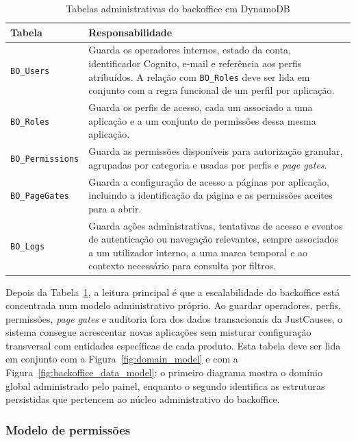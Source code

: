 \begin{table}[H]
\caption{Tabelas administrativas do backoffice em DynamoDB}
\label{tab:modelo_dados_admin}
\begin{center}
\small
\begin{tabular}{|l|p{9cm}|}
\hline
\textbf{Tabela} & \textbf{Responsabilidade} \\ \hline
\texttt{BO\_Users} & Guarda os operadores internos, estado da conta, identificador Cognito, e-mail e referência aos perfis atribuídos. A relação com \texttt{BO\_Roles} deve ser lida em conjunto com a regra funcional de um perfil por aplicação. \\ \hline
\texttt{BO\_Roles} & Guarda os perfis de acesso, cada um associado a uma aplicação e a um conjunto de permissões dessa mesma aplicação. \\ \hline
\texttt{BO\_Permissions} & Guarda as permissões disponíveis para autorização granular, agrupadas por categoria e usadas por perfis e \textit{page gates}. \\ \hline
\texttt{BO\_PageGates} & Guarda a configuração de acesso a páginas por aplicação, incluindo a identificação da página e as permissões aceites para a abrir. \\ \hline
\texttt{BO\_Logs} & Guarda ações administrativas, tentativas de acesso e eventos de autenticação ou navegação relevantes, sempre associados a um utilizador interno, a uma marca temporal e ao contexto necessário para consulta por filtros. \\ \hline
\end{tabular}
\end{center}
\end{table}

Depois da Tabela~\ref{tab:modelo_dados_admin}, a leitura principal é que a escalabilidade do backoffice está concentrada num modelo administrativo próprio. Ao guardar operadores, perfis, permissões, \textit{page gates} e auditoria fora dos dados transacionais da JustCauses, o sistema consegue acrescentar novas aplicações sem misturar configuração transversal com entidades específicas de cada produto. Esta tabela deve ser lida em conjunto com a Figura~\ref{fig:domain_model} e com a Figura~\ref{fig:backoffice_data_model}: o primeiro diagrama mostra o domínio global administrado pelo painel, enquanto o segundo identifica as estruturas persistidas que pertencem ao núcleo administrativo do backoffice.

\subsubsection{Modelo de permissões}
\label{sec:modelo_permissoes}

